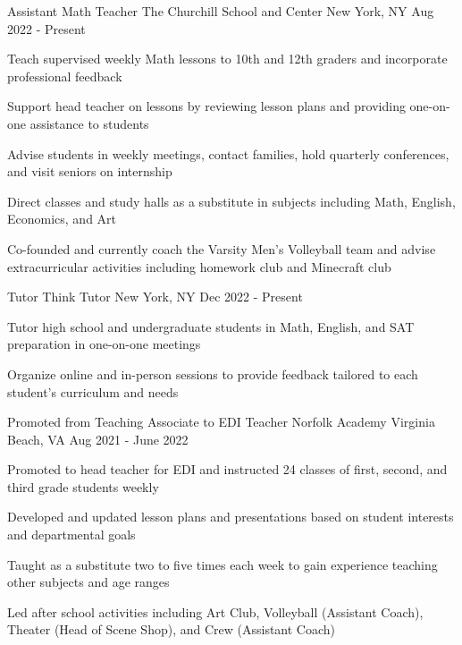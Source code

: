 \begin{cventries}
  \cventry
  {Assistant Math Teacher}
  {The Churchill School and Center}
  {New York, NY}
  {Aug 2022 - Present}
  {
    \begin{cvitems}
      \item {Teach supervised weekly Math lessons to 10th and 12th graders and incorporate professional feedback}
      \item {Support head teacher on lessons by reviewing lesson plans and providing one-on-one assistance to students}
      \item {Advise students in weekly meetings, contact families, hold quarterly conferences, and visit seniors on internship}
      \item {Direct classes and study halls as a substitute in subjects including Math, English, Economics, and Art}
      \item {Co-founded and currently coach the Varsity Men's Volleyball team and advise extracurricular activities including homework club and Minecraft club}
    \end{cvitems}
  }

  \cventry
  {Tutor}
  {Think Tutor}
  {New York, NY}
  {Dec 2022 - Present}
  {
    \begin{cvitems}
      \item {Tutor high school and undergraduate students in Math, English, and SAT preparation in one-on-one meetings}
      \item {Organize online and in-person sessions to provide feedback tailored to each student's curriculum and needs}
    \end{cvitems}
  }

  \cventry
  {Promoted from Teaching Associate to EDI Teacher}
  {Norfolk Academy}
  {Virginia Beach, VA}
  {Aug 2021 - June 2022}
  {
    \begin{cvitems}
      \item {Promoted to head teacher for EDI and instructed 24 classes of first, second, and third grade students weekly}
      \item {Developed and updated lesson plans and presentations based on student interests and departmental goals}
      \item {Taught as a substitute two to five times each week to gain experience teaching other subjects and age ranges}
      \item {Led after school activities including Art Club, Volleyball (Assistant Coach), Theater (Head of Scene Shop), and Crew (Assistant Coach)}
    \end{cvitems}
  }


\end{cventries}
